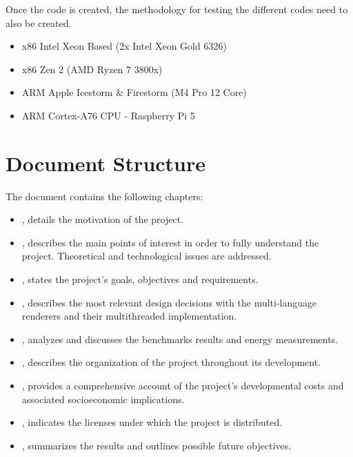 Once the code is created, the methodology for testing the different codes need to also be created. \begin{itemize}
    \item x86 Intel Xeon Based (2x Intel Xeon Gold 6326)
    \item x86 Zen 2 (AMD Ryzen 7 3800x)
    \item ARM Apple Icestorm \& Firestorm (M4 Pro 12 Core)
    \item ARM Cortex-A76 CPU - Raspberry Pi 5
\end{itemize} 

\section{Document Structure}\label{sec:structure}
The document contains the following chapters:
\begin{itemize}
  \item {}, details the motivation of the project.
  \item {}, describes the main points of interest in order to fully understand the project. Theoretical and technological issues are addressed.
  \item {}, states the project's goals, objectives and requirements.
  \item {}, describes the most relevant design decisions with the multi-language renderers and their multithreaded implementation.
  \item {}, analyzes and discusses the benchmarks results and energy measurements.
  \item {}, describes the organization of the project throughout its development.
  \item {}, provides a comprehensive account of the project's developmental costs and associated socioeconomic implications.
  \item {}, indicates the licenses under which the project is distributed.
  \item {}, summarizes the results and outlines possible future objectives.
\end{itemize}
